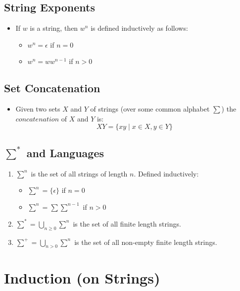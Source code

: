 \subsection{String Exponents}
\begin{itemize}
    \item If $w$ is a string, then $w^n$ is defined inductively as follows:
        \begin{itemize}
            \item $w^n = \epsilon$ if $n = 0$
            \item $w^n = ww^{n-1}$ if $n > 0$
        \end{itemize}
\end{itemize}

\subsection{Set Concatenation}
\begin{itemize}
    \item Given two sets $X$ and $Y$ of strings (over some common alphabet $\sum$) the $concatenation$ of $X$ and $Y$ is:
    \begin{equation}
        XY = \{ xy \mid x \in X, y \in Y \}
    \end{equation}
\end{itemize}

\subsection{$\sum^{\ast}$ and Languages}
\begin{enumerate}
    \item $\sum^{n}$ is the set of all strings of length $n$. Defined inductively:
        \begin{itemize}
            \item $\sum^{n} = \{ \epsilon \}$ if $n = 0$
            \item $\sum^{n} = \sum\sum^{n-1}$ if $n > 0$
        \end{itemize}
    \item $\sum^{\ast} = \bigcup_{n \geq 0} \sum^{n}$ is the set of all finite length strings.
    \item $\sum^{+} = \bigcup_{n > 0} \sum^{n}$ is the set of all non-empty finite length strings.
\end{enumerate}

\section{Induction (on Strings)}

